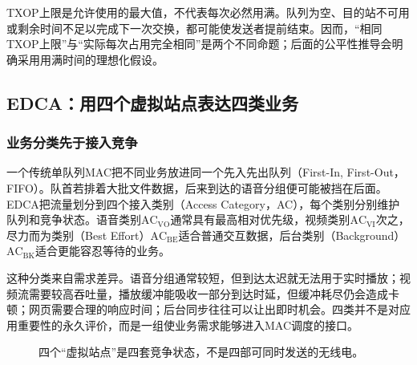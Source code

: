 TXOP上限是允许使用的最大值，不代表每次必然用满。队列为空、目的站不可用或剩余时间不足以完成下一次交换，都可能使发送者提前结束。因而，“相同TXOP上限”与“实际每次占用完全相同”是两个不同命题；后面的公平性推导会明确采用用满时间的理想化假设。

\subsection{EDCA：用四个虚拟站点表达四类业务}

\subsubsection{业务分类先于接入竞争}

一个传统单队列MAC把不同业务放进同一个先入先出队列（First-In, First-Out，FIFO）。队首若排着大批文件数据，后来到达的语音分组便可能被挡在后面。EDCA把流量划分到四个接入类别（Access Category，AC），每个类别分别维护队列和竞争状态。语音类别$\mathrm{AC}_{\mathrm{VO}}$通常具有最高相对优先级，视频类别$\mathrm{AC}_{\mathrm{VI}}$次之，尽力而为类别（Best Effort）$\mathrm{AC}_{\mathrm{BE}}$适合普通交互数据，后台类别（Background）$\mathrm{AC}_{\mathrm{BK}}$适合更能容忍等待的业务。

这种分类来自需求差异。语音分组通常较短，但到达太迟就无法用于实时播放；视频流需要较高吞吐量，播放缓冲能吸收一部分到达时延，但缓冲耗尽仍会造成卡顿；网页需要合理的响应时间；后台同步往往可以让出即时机会。四类并不是对应用重要性的永久评价，而是一组使业务需求能够进入MAC调度的接口。

\begin{figure}[htbp]
\centering
{}
\caption{四个“虚拟站点”是四套竞争状态，不是四部可同时发送的无线电。}
\end{figure}

